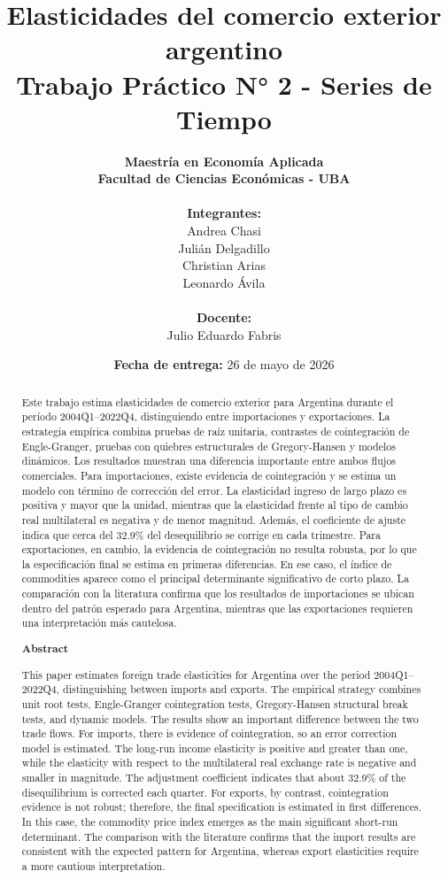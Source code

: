 \documentclass[11pt]{article}
\title{%
\textbf{Elasticidades del comercio exterior argentino} \\
\large \textbf{Trabajo Práctico N° 2 - Series de Tiempo}
}
\author{
\textbf{Maestría en Economía Aplicada} \\
\textbf{Facultad de Ciencias Económicas - UBA} \\
\\
\textbf{Integrantes:} \\
Andrea Chasi \\
Julián Delgadillo \\
Christian Arias \\
Leonardo Ávila \\
\\
\textbf{Docente:} \\
Julio Eduardo Fabris
}
\date{\textbf{Fecha de entrega:} 26 de mayo de 2026}
\begin{document}
\maketitle

\begin{abstract}
\label{sec:abstract}
Este trabajo estima elasticidades de comercio exterior para Argentina durante
el período 2004Q1--2022Q4, distinguiendo entre importaciones y exportaciones.
La estrategia empírica combina pruebas de raíz unitaria, contrastes de
cointegración de Engle-Granger, pruebas con quiebres estructurales de
Gregory-Hansen y modelos dinámicos. Los resultados muestran una diferencia
importante entre ambos flujos comerciales. Para importaciones, existe evidencia
de cointegración y se estima un modelo con término de corrección del error. La
elasticidad ingreso de largo plazo es positiva y mayor que la unidad, mientras
que la elasticidad frente al tipo de cambio real multilateral es negativa y de
menor magnitud. Además, el coeficiente de ajuste indica que cerca del 32.9\% del
desequilibrio se corrige en cada trimestre. Para exportaciones, en cambio, la
evidencia de cointegración no resulta robusta, por lo que la especificación
final se estima en primeras diferencias. En ese caso, el índice de commodities
aparece como el principal determinante significativo de corto plazo. La
comparación con la literatura confirma que los resultados de importaciones se
ubican dentro del patrón esperado para Argentina, mientras que las exportaciones
requieren una interpretación más cautelosa.

\vspace{0.8em}
\begin{center}
\textbf{Abstract}
\end{center}

This paper estimates foreign trade elasticities for Argentina
over the period 2004Q1--2022Q4, distinguishing between imports and exports. The
empirical strategy combines unit root tests, Engle-Granger cointegration tests,
Gregory-Hansen structural break tests, and dynamic models. The results show an
important difference between the two trade flows. For imports, there is evidence
of cointegration, so an error correction model is estimated. The long-run income
elasticity is positive and greater than one, while the elasticity with respect
to the multilateral real exchange rate is negative and smaller in magnitude.
The adjustment coefficient indicates that about 32.9\% of the disequilibrium is
corrected each quarter. For exports, by contrast, cointegration evidence is not
robust; therefore, the final specification is estimated in first differences.
In this case, the commodity price index emerges as the main significant
short-run determinant. The comparison with the literature confirms that the
import results are consistent with the expected pattern for Argentina, whereas
export elasticities require a more cautious interpretation.
\end{abstract}
\end{document}
